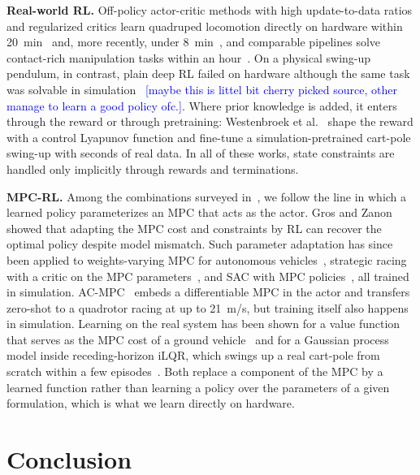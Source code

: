 \documentclass{l4dc2027}
\let\cite\citep
\newcommand{\note}[1]{\textcolor{blue}{[#1]}}
\begin{document}
\textbf{Real-world RL.} Off-policy actor-critic methods with high
update-to-data ratios and regularized critics learn quadruped locomotion
directly on hardware within 20~min~\cite{smith2022walk} and, more recently,
under 8~min~\cite{bohlinger2025gait}, and comparable pipelines solve contact-rich
manipulation tasks within an hour~\cite{luo2024serl}. On a physical swing-up
pendulum, in contrast, plain deep RL failed on hardware although the same task
was solvable in simulation~\cite{bohm2022lowcost} \note{maybe this is littel bit cherry picked source, other manage to learn a good policy ofc.}. Where prior knowledge is
added, it enters through the reward or through pretraining:
Westenbroek et al.~\cite{westenbroek2022lyapunov} shape the reward with a
control Lyapunov function and fine-tune a simulation-pretrained cart-pole
swing-up with seconds of real data. In all of these works, state constraints
are handled only implicitly through rewards and terminations.

\textbf{MPC-RL.} Among the combinations surveyed in~\cite{reiter2025synthesis},
we follow the line in which a learned policy parameterizes an MPC that acts as
the actor. Gros and Zanon~\cite{gros2020datadriven} showed that adapting the
MPC cost and constraints by RL can recover the optimal policy despite model
mismatch. Such parameter adaptation has since been applied to weights-varying
MPC for autonomous vehicles~\cite{zarrouki2021weights,zarrouki2024safe},
strategic racing with a critic on the MPC parameters~\cite{reiter2023hierarchical},
and SAC with MPC policies~\cite{fichtner2025thesis}, all trained in
simulation. AC-MPC~\cite{romero2024acmpc,romero2025acmpc} embeds a
differentiable MPC in the actor and transfers zero-shot to a quadrotor racing
at up to 21~m/s, but training itself also happens in simulation. Learning on
the real system has been shown for a value function that serves as the MPC
cost of a ground vehicle~\cite{karnchanachari2020practical} and for a Gaussian
process model inside receding-horizon iLQR, which swings up a real cart-pole
from scratch within a few episodes~\cite{boedecker2014approximate}. Both
replace a component of the MPC by a learned function rather than learning a
policy over the parameters of a given formulation, which is what we learn
directly on hardware.

\section{Conclusion}
\end{document}
